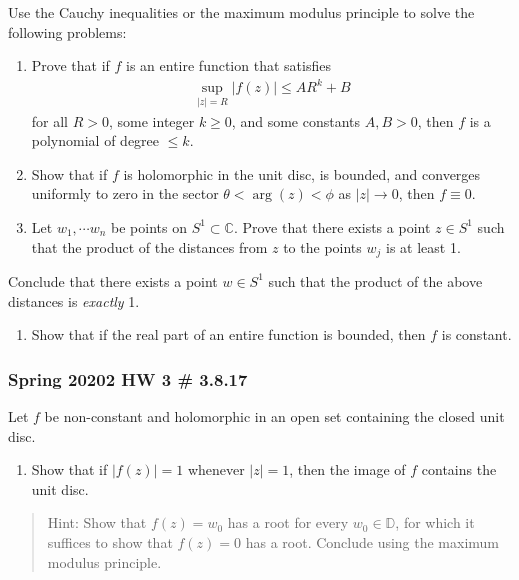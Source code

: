 Use the Cauchy inequalities or the maximum modulus principle to solve
the following problems:

\begin{enumerate}
\def\labelenumi{\alph{enumi}.}
\item
  Prove that if \(f\) is an entire function that satisfies
  \begin{align*}
  \sup _{|z|=R}|f(z)| \leq A R^{k}+B
  \end{align*}
  for all \(R>0\), some integer \(k\geq 0\), and some constants
  \(A, B > 0\), then \(f\) is a polynomial of degree \(\leq k\).
\item
  Show that if \(f\) is holomorphic in the unit disc, is bounded, and
  converges uniformly to zero in the sector \(\theta < \arg(z) < \phi\)
  as \({\left\lvert {z} \right\rvert} \to 0\), then \(f \equiv 0\).
\item
  Let \(w_1, \cdots w_n\) be points on \(S^1 \subset {\mathbb{C}}\).
  Prove that there exists a point \(z\in S^1\) such that the product of
  the distances from \(z\) to the points \(w_j\) is at least 1.
\end{enumerate}

Conclude that there exists a point \(w\in S^1\) such that the product of
the above distances is \emph{exactly} 1.

\begin{enumerate}
\def\labelenumi{\alph{enumi}.}
\setcounter{enumi}{3}
\tightlist
\item
  Show that if the real part of an entire function is bounded, then
  \(f\) is constant.
\end{enumerate}

\hypertarget{spring-20202-hw-3-3.8.17}{%
\subsubsection{Spring 20202 HW 3 \#
3.8.17}\label{spring-20202-hw-3-3.8.17}}

Let \(f\) be non-constant and holomorphic in an open set containing the
closed unit disc.

\begin{enumerate}
\def\labelenumi{\alph{enumi}.}
\tightlist
\item
  Show that if \({\left\lvert {f(z)} \right\rvert} = 1\) whenever
  \({\left\lvert {z} \right\rvert} = 1\), then the image of \(f\)
  contains the unit disc.
\end{enumerate}

\begin{quote}
Hint: Show that \(f(z) = w_0\) has a root for every
\(w_0 \in {\mathbb{D}}\), for which it suffices to show that
\(f(z) = 0\) has a root. Conclude using the maximum modulus principle.
\end{quote}

